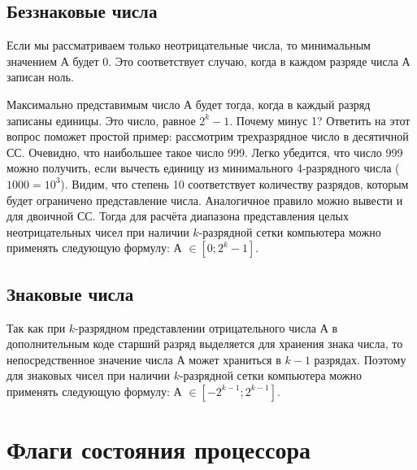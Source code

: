 \subsection{Беззнаковые числа}
Если мы рассматриваем только неотрицательные числа, то минимальным значением А будет 0. Это соответствует случаю, когда в каждом разряде числа А записан ноль.

Максимально представимым число А будет тогда, когда в каждый разряд записаны единицы. Это число, равное $2^k-1$.
Почему минус 1? Ответить на этот вопрос поможет простой пример: рассмотрим трехразрядное число в десятичной СС. Очевидно, что наибольшее такое число 999. Легко убедится, что число 999 можно получить, если вычесть единицу из минимального 4-разрядного числа ($1000 = 10^3$). Видим, что степень 10 соответствует количеству разрядов, которым будет ограничено представление числа. Аналогичное правило можно вывести и для двоичной СС. Тогда для расчёта диапазона представления целых неотрицательных чисел при наличии $k$-разрядной сетки компьютера можно применять следующую формулу: А $\in [0;2^k-1]$.

\subsection{Знаковые числа}
Так как при $k$-разрядном представлении отрицательного числа А в дополнительным коде старший разряд выделяется для хранения знака числа, то непосредственное значение числа А может храниться в $k-1$ разрядах. Поэтому для знаковых чисел при наличии $k$-разрядной сетки компьютера можно применять следующую формулу: А $\in [-2^{k-1};2^{k-1}]$.

\section{Флаги состояния процессора}

